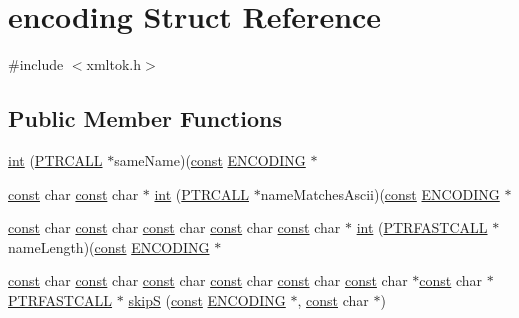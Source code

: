 \hypertarget{structencoding}{}\section{encoding Struct Reference}
\label{structencoding}


{\ttfamily \#include $<$xmltok.\+h$>$}

\subsection*{Public Member Functions}
\begin{DoxyCompactItemize}
\item 
\hyperlink{structencoding_a92bcf4f50db1c279fc5eda73472d7202}{int} (\hyperlink{expat_2lib_2internal_8h_af44f68911377fd55f6e1588b0c89b3e5}{P\+T\+R\+C\+A\+LL} $\ast$same\+Name)(\hyperlink{getopt1_8c_a2c212835823e3c54a8ab6d95c652660e}{const} \hyperlink{xmltok_8h_a46834e73898ebab478b38f817a8c6fc0}{E\+N\+C\+O\+D\+I\+NG} $\ast$
\item 
\hyperlink{getopt1_8c_a2c212835823e3c54a8ab6d95c652660e}{const} char \hyperlink{getopt1_8c_a2c212835823e3c54a8ab6d95c652660e}{const} char $\ast$ \hyperlink{structencoding_a77b5f977505072990c8d0a710cc9e1fd}{int} (\hyperlink{expat_2lib_2internal_8h_af44f68911377fd55f6e1588b0c89b3e5}{P\+T\+R\+C\+A\+LL} $\ast$name\+Matches\+Ascii)(\hyperlink{getopt1_8c_a2c212835823e3c54a8ab6d95c652660e}{const} \hyperlink{xmltok_8h_a46834e73898ebab478b38f817a8c6fc0}{E\+N\+C\+O\+D\+I\+NG} $\ast$
\item 
\hyperlink{getopt1_8c_a2c212835823e3c54a8ab6d95c652660e}{const} char \hyperlink{getopt1_8c_a2c212835823e3c54a8ab6d95c652660e}{const} char \hyperlink{getopt1_8c_a2c212835823e3c54a8ab6d95c652660e}{const} char \hyperlink{getopt1_8c_a2c212835823e3c54a8ab6d95c652660e}{const} char \hyperlink{getopt1_8c_a2c212835823e3c54a8ab6d95c652660e}{const} char $\ast$ \hyperlink{structencoding_a76792dbef2f157c76216dae48d233faf}{int} (\hyperlink{expat_2lib_2internal_8h_a6e4a6029ec5edd313bac38ae0e17db07}{P\+T\+R\+F\+A\+S\+T\+C\+A\+LL} $\ast$name\+Length)(\hyperlink{getopt1_8c_a2c212835823e3c54a8ab6d95c652660e}{const} \hyperlink{xmltok_8h_a46834e73898ebab478b38f817a8c6fc0}{E\+N\+C\+O\+D\+I\+NG} $\ast$
\item 
\hyperlink{getopt1_8c_a2c212835823e3c54a8ab6d95c652660e}{const} char \hyperlink{getopt1_8c_a2c212835823e3c54a8ab6d95c652660e}{const} char \hyperlink{getopt1_8c_a2c212835823e3c54a8ab6d95c652660e}{const} char \hyperlink{getopt1_8c_a2c212835823e3c54a8ab6d95c652660e}{const} char \hyperlink{getopt1_8c_a2c212835823e3c54a8ab6d95c652660e}{const} char \hyperlink{getopt1_8c_a2c212835823e3c54a8ab6d95c652660e}{const} char $\ast$\hyperlink{getopt1_8c_a2c212835823e3c54a8ab6d95c652660e}{const} char $\ast$\hyperlink{expat_2lib_2internal_8h_a6e4a6029ec5edd313bac38ae0e17db07}{P\+T\+R\+F\+A\+S\+T\+C\+A\+LL} $\ast$ \hyperlink{structencoding_a997a21e1c95efd5497d359d43a2d1d17}{skipS} (\hyperlink{getopt1_8c_a2c212835823e3c54a8ab6d95c652660e}{const} \hyperlink{xmltok_8h_a46834e73898ebab478b38f817a8c6fc0}{E\+N\+C\+O\+D\+I\+NG} $\ast$, \hyperlink{getopt1_8c_a2c212835823e3c54a8ab6d95c652660e}{const} char $\ast$)

\end{DoxyCompactItemize}

